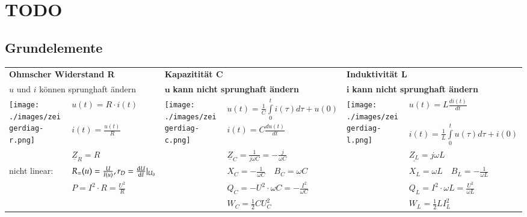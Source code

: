 \section{TODO}
  	\subsection{Grundelemente}
  	\begin{tabular}{p{1.5cm} p{4.3cm} |p{1.5cm} p{4.3cm}| p{1.5cm} p{4.3cm}}
  		\multicolumn{2}{l}{\textbf{Ohmscher Widerstand R}}
  		& \multicolumn{2}{l}{\textbf{Kapazitität C}}
  		& \multicolumn{2}{l}{\textbf{Induktivität L}} \\
  		\multicolumn{2}{l}{$u$ und $i$ können sprunghaft ändern}
  		& \multicolumn{2}{l}{$\mathbf{u}$ \textbf{kann nicht sprunghaft ändern}}
  		& \multicolumn{2}{l}{$\mathbf{i}$ \textbf{kann nicht sprunghaft ändern}} \\
  		
  		\multirow{2}{1.5cm}{
  			\texttt{[image: ./images/zeigerdiag-r.png]}}
  		& $u(t) = R \cdot i(t)$ 
  		& \multirow{2}{1.5cm}{\texttt{[image: ./images/zeigerdiag-c.png]}}
  		& $u(t) = \frac{1}{C} \int\limits_0^t i(\tau) d\tau + u(0)$
  		& 
  		\multirow{2}{1.5cm}{\texttt{[image: ./images/zeigerdiag-l.png]}}
  		&$u(t) = L \frac{di(t)}{dt}$\\
  		
  		&$i(t) = \frac{u(t)}{R}$
  		& & $i(t) = C \frac{d u(t)}{dt}$
  		& & $i(t) = \frac{1}{L} \int\limits_0^t u(\tau) d\tau + i(0)$\\
  		
  		& $\underline{Z}_R = R$
  		& & $\underline{Z}_C = \frac{1}{j \omega C} = - \frac{j}{\omega C}$
  		& & $\underline{Z_L} = j \omega L$\\
  		
  		\parbox{1.7cm}{\small{nicht linear:}}
  		& $R_=(u) = \frac{U}{I(u)}, r_D = \frac{\mathop{}\!\mathrm{d} U}{\mathop{}\!\mathrm{d} I}\lvert_{U_0}$
  		& & $X_C = -\frac{1}{\omega C} \quad B_C = \omega C$
  		& & $X_L = \omega L
  		\quad B_L = -\frac{1}{\omega L}$ \\
  		
  		& $P=I^2 \cdot R = \frac{U^2}{R}$
  		& & $Q_C= - U^2 \cdot \omega C = - \frac{I^2}{\omega C}$
  		& & $Q_L= I^2 \cdot \omega L = \frac{U^2}{\omega L}$\\
  		
  		& & & $W_C=\frac12 C U_C^2$
  		& &$W_L=\frac12 L I_L^2$
  	\end{tabular}

